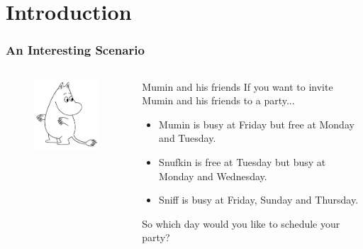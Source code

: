 \section{Introduction}

\begin{frame}
	\frametitle{An Interesting Scenario}
	\begin{columns}
		\begin{column}{.4\textwidth}
		\begin{figure}
			\centering
			\includegraphics[width=5cm]{Mumin}
		\end{figure}
		\end{column}
		\begin{column}{.5\textwidth}
		\begin{alertblock}{Mumin and his friends}
			If you want to invite Mumin and his friends to a party...
			\begin{itemize}
				\item Mumin is busy at Friday but free at Monday and Tuesday.
				\item Snufkin is free at Tuesday but busy at Monday and Wednesday.
				\item Sniff is busy at Friday, Sunday and Thursday.
			\end{itemize}
		So which day would you like to schedule your party? 
		\end{alertblock}	
		\end{column}
	\end{columns}	
\end{frame}

